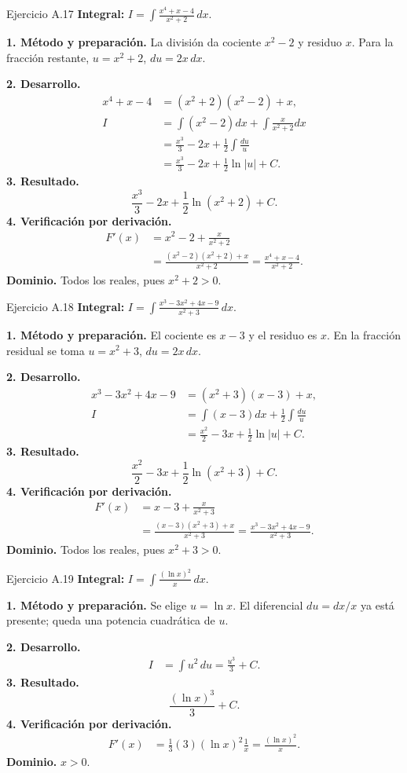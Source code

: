 \begin{examplebox}{Ejercicio A.17}
\textbf{Integral:} $\displaystyle I=\int \frac{x^4+x-4}{x^2+2}\,dx$.

\textbf{1. Método y preparación.} La división da cociente $x^2-2$ y residuo $x$. Para la fracción restante, $u=x^2+2$, $du=2x\,dx$.

\textbf{2. Desarrollo.}
\begin{align*}
x^4+x-4&=(x^2+2)(x^2-2)+x,\\I&=\int(x^2-2)dx+\int\frac{x}{x^2+2}dx\\&=\frac{x^3}{3}-2x+\frac12\int\frac{du}{u}\\&=\frac{x^3}{3}-2x+\frac12\ln|u|+C.
\end{align*}
\textbf{3. Resultado.}
\[
\frac{x^3}{3}-2x+\frac12\ln(x^2+2)+C.
\]
\textbf{4. Verificación por derivación.}
\begin{align*}
F'(x)&=x^2-2+\frac{x}{x^2+2}\\&=\frac{(x^2-2)(x^2+2)+x}{x^2+2}=\frac{x^4+x-4}{x^2+2}.
\end{align*}
\textbf{Dominio.} Todos los reales, pues $x^2+2>0$.
\end{examplebox}

\begin{examplebox}{Ejercicio A.18}
\textbf{Integral:} $\displaystyle I=\int \frac{x^3-3x^2+4x-9}{x^2+3}\,dx$.

\textbf{1. Método y preparación.} El cociente es $x-3$ y el residuo es $x$. En la fracción residual se toma $u=x^2+3$, $du=2x\,dx$.

\textbf{2. Desarrollo.}
\begin{align*}
x^3-3x^2+4x-9&=(x^2+3)(x-3)+x,\\I&=\int(x-3)dx+\frac12\int\frac{du}{u}\\&=\frac{x^2}{2}-3x+\frac12\ln|u|+C.
\end{align*}
\textbf{3. Resultado.}
\[
\frac{x^2}{2}-3x+\frac12\ln(x^2+3)+C.
\]
\textbf{4. Verificación por derivación.}
\begin{align*}
F'(x)&=x-3+\frac{x}{x^2+3}\\&=\frac{(x-3)(x^2+3)+x}{x^2+3}=\frac{x^3-3x^2+4x-9}{x^2+3}.
\end{align*}
\textbf{Dominio.} Todos los reales, pues $x^2+3>0$.
\end{examplebox}

\begin{examplebox}{Ejercicio A.19}
\textbf{Integral:} $\displaystyle I=\int \frac{(\ln x)^2}{x}\,dx$.

\textbf{1. Método y preparación.} Se elige $u=\ln x$. El diferencial $du=dx/x$ ya está presente; queda una potencia cuadrática de $u$.

\textbf{2. Desarrollo.}
\begin{align*}
I&=\int u^2\,du=\frac{u^3}{3}+C.
\end{align*}
\textbf{3. Resultado.}
\[
\frac{(\ln x)^3}{3}+C.
\]
\textbf{4. Verificación por derivación.}
\begin{align*}
F'(x)&=\frac13(3)(\ln x)^2\frac1x=\frac{(\ln x)^2}{x}.
\end{align*}
\textbf{Dominio.} $x>0$.
\end{examplebox}

